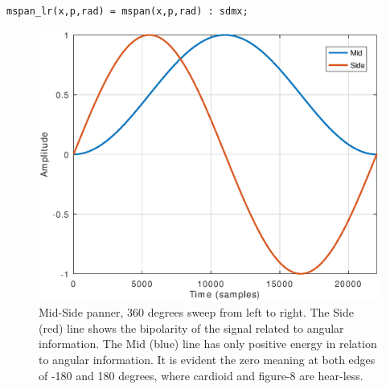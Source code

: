 \documentclass{article}
\begin{document}
\begin{lstlisting}
mspan_lr(x,p,rad) = mspan(x,p,rad) : sdmx;
\end{lstlisting}

\begin{figure}[h]
\centering
\includegraphics[width=1\columnwidth]{mspan}
\caption{Mid-Side panner, 360 degrees sweep from left to right. The Side (red) line shows the bipolarity of the signal related to angular information. The Mid (blue) line has only positive energy in relation to angular information. It is evident the zero meaning at both edges of -180 and 180 degrees, where cardioid and figure-8 are hear-less.}
\label{fig:mspan}
\end{figure}
\end{document}
